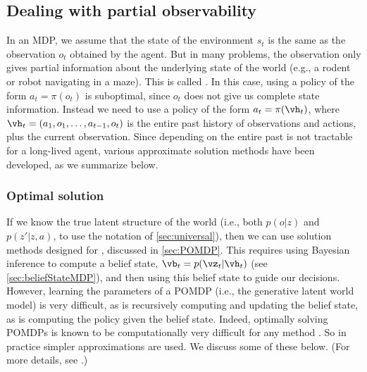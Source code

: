 \subsection{Dealing with partial observability}
\label{sec:partialObs}

In an MDP, we assume that the state of the environment $s_t$
is the same as the observation $o_t$ obtained by the agent.
But in many problems, the observation only gives partial information
about the underlying state of the world
(e.g., a rodent or robot navigating in a maze).
This is called .
In this case, using a policy of the form
$a_t = \pi(o_t)$ is suboptimal, since $o_t$
does not give us complete state information.
Instead we need to use a policy of the form
$a_t = \pi(\vh_t)$,
where $\vh_t=(a_1, o_1,  \ldots, a_{t-1}, o_t)$
is the entire past history of observations and actions,
plus the current observation.
Since depending on the entire past is not tractable
for a long-lived agent, various approximate solution methods
have been developed, as we summarize below.

\subsubsection{Optimal solution}

If we know the true latent structure of the world
(i.e., both $p(o|z)$ and $p(z'|z,a)$, to use the notation
of \cref{sec:universal}),
then we can use solution methods designed
for  , discussed in \cref{sec:POMDP}.
This requires using Bayesian inference to  compute a belief state,
$\vb_t = p(\vz_t|\vh_t)$ (see \cref{sec:beliefStateMDP}),
and then using this belief state
to guide our decisions.
However, learning the parameters of a POMDP (i.e., 
the  generative latent world model) is very difficult,
as is recursively computing and updating the belief state,
as is computing the policy given the belief state.
Indeed, optimally solving POMDPs is known to be
computationally very difficult for any method
\citep{Papadimitriou87,Kaelbling98}.
So in practice simpler approximations are used.
We discuss some of these below.
(For more details, see \citep{Murphy00pomdp}.)


